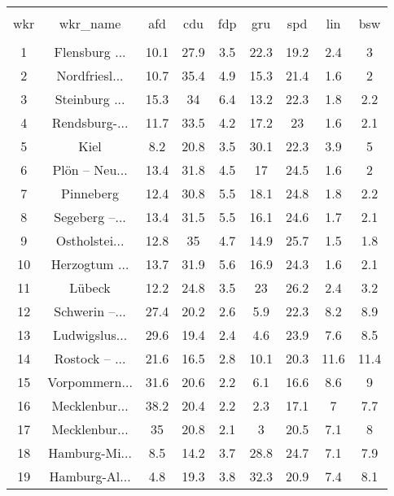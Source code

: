 
\begin{table}[!htbp] \centering 
  \caption{} 
  \label{} 
\begin{tabular}{@{\extracolsep{5pt}} ccccccccc} 
\\[-1.8ex]\hline 
\hline \\[-1.8ex] 
wkr & wkr\_name & afd & cdu & fdp & gru & spd & lin & bsw \\ 
\hline \\[-1.8ex] 
1 & Flensburg ... & 10.1 & 27.9 & 3.5 & 22.3 & 19.2 & 2.4 & 3 \\ 
2 & Nordfriesl... & 10.7 & 35.4 & 4.9 & 15.3 & 21.4 & 1.6 & 2 \\ 
3 & Steinburg ... & 15.3 & 34 & 6.4 & 13.2 & 22.3 & 1.8 & 2.2 \\ 
4 & Rendsburg-... & 11.7 & 33.5 & 4.2 & 17.2 & 23 & 1.6 & 2.1 \\ 
5 & Kiel & 8.2 & 20.8 & 3.5 & 30.1 & 22.3 & 3.9 & 5 \\ 
6 & Plön – Neu... & 13.4 & 31.8 & 4.5 & 17 & 24.5 & 1.6 & 2 \\ 
7 & Pinneberg & 12.4 & 30.8 & 5.5 & 18.1 & 24.8 & 1.8 & 2.2 \\ 
8 & Segeberg –... & 13.4 & 31.5 & 5.5 & 16.1 & 24.6 & 1.7 & 2.1 \\ 
9 & Ostholstei... & 12.8 & 35 & 4.7 & 14.9 & 25.7 & 1.5 & 1.8 \\ 
10 & Herzogtum ... & 13.7 & 31.9 & 5.6 & 16.9 & 24.3 & 1.6 & 2.1 \\ 
11 & Lübeck & 12.2 & 24.8 & 3.5 & 23 & 26.2 & 2.4 & 3.2 \\ 
12 & Schwerin –... & 27.4 & 20.2 & 2.6 & 5.9 & 22.3 & 8.2 & 8.9 \\ 
13 & Ludwigslus... & 29.6 & 19.4 & 2.4 & 4.6 & 23.9 & 7.6 & 8.5 \\ 
14 & Rostock – ... & 21.6 & 16.5 & 2.8 & 10.1 & 20.3 & 11.6 & 11.4 \\ 
15 & Vorpommern... & 31.6 & 20.6 & 2.2 & 6.1 & 16.6 & 8.6 & 9 \\ 
16 & Mecklenbur... & 38.2 & 20.4 & 2.2 & 2.3 & 17.1 & 7 & 7.7 \\ 
17 & Mecklenbur... & 35 & 20.8 & 2.1 & 3 & 20.5 & 7.1 & 8 \\ 
18 & Hamburg-Mi... & 8.5 & 14.2 & 3.7 & 28.8 & 24.7 & 7.1 & 7.9 \\ 
19 & Hamburg-Al... & 4.8 & 19.3 & 3.8 & 32.3 & 20.9 & 7.4 & 8.1 \\ 

\end{tabular}
\end{table}
